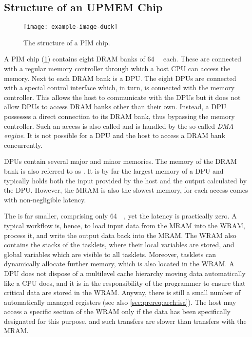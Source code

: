 \subsection{Structure of an UPMEM Chip}
\label{sec:prereq:arch:structure}

\begin{figure}
	\centering
	\texttt{[image: example-image-duck]}

	\caption{
		The structure of a \ac{PIM} chip.
	}
	\label{fig:arch:chip}
\end{figure}

A \ac{PIM} chip (\cref{fig:arch:chip}) contains eight \ac{DRAM} banks of \qty{64}{\mebi\byte} each.
These are connected with a regular memory controller through which a host \ac{CPU} can access the memory.
Next to each \ac{DRAM} bank is a \ac{DPU}.
The eight \acp{DPU} are connected with a special control interface which, in turn, is connected with the memory controller.
This allows the host to communicate with the \acp{DPU} but it does not allow \acp{DPU} to access \ac{DRAM} banks other than their own.
Instead, a \ac{DPU} possesses a direct connection to its \ac{DRAM} bank, thus bypassing the memory controller.
Such an access is also called  and is handled by the so-called \emph{\ac{DMA} engine}.
It is not possible for a \ac{DPU} and the host to access a \ac{DRAM} bank concurrently.

\Acp{DPU} contain several major and minor memories.
The memory of the \ac{DRAM} bank is also referred to as .
It is by far the largest memory of a \ac{DPU} and typically holds both the input provided by the host and the output calculated by the \ac{DPU}.
However, the \ac{MRAM} is also the slowest memory, for each access comes with non-negligible latency.

The  is far smaller, comprising only \qty{64}{\kibi\byte}, yet the latency is practically zero.
A typical workflow is, hence, to load input data from the \ac{MRAM} into the \ac{WRAM}, process it, and write the output data back into the \ac{MRAM}.
The \ac{WRAM} also contains the stacks of the tasklets, where their local variables are stored, and global variables which are visible to all tasklets.
Moreover, tasklets can dynamically allocate further memory, which is also located in the \ac{WRAM}.
A \ac{DPU} does not dispose of a multilevel cache hierarchy moving data automatically like a \ac{CPU} does, and it is in the responsibility of the programmer to ensure that critical data are stored in the \ac{WRAM}.
Anyway, there is still a small number of automatically managed registers (see also \cref{sec:prereq:arch:isa}).
The host may access a specific section of the \ac{WRAM} only if the data has been specifically designated for this purpose, and such transfers are slower than transfers with the \ac{MRAM}.

